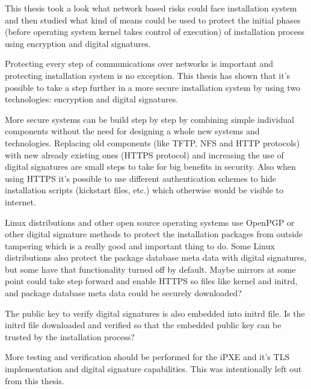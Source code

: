 
\iffalse
\begin{itemize}
\item FIXME: remove this list
\item CONCLUSIONS: reference to purpose of study
\item CONCLUSIONS: value of / reasons for the study
\item CONCLUSIONS: review of important findings / conclusions
\item CONCLUSIONS: comments, explanations or speculations about findings
\item CONCLUSIONS: limitations of study
\item CONCLUSIONS: implications of study or generalizations
\item CONCLUSIONS: recommendations for future or practical applications - USUALLY SKIPPED
\end{itemize}
\fi

This thesis took a look what network based risks could face
installation system and then studied what kind of means could be used
to protect the initial phases (before operating system kernel takes
control of execution) of installation process using encryption and
digital signatures.

Protecting every step of communications over networks is important and
protecting installation system is no exception. This thesis has shown
that it's possible to take a step further in a more secure
installation system by using two technologies: encryption and digital
signatures.

More secure systems can be build step by step by combining simple
individual components without the need for designing a whole new
systems and technologies. Replacing old components (like TFTP, NFS and
HTTP protocols) with new already existing ones (HTTPS protocol) and
increasing the use of digital signatures are small steps to take for
big benefits in security. Also when using HTTPS it's possible to use
different authentication schemes to hide installation scripts
(kickstart files, etc.) which otherwise would be visible to internet.

Linux distributions and other open source operating systems use
OpenPGP or other digital signature methods to protect the installation
packages from outside tampering which is a really good and important
thing to do. Some Linux distributions also protect the package
database meta data with digital signatures, but some have that
functionality turned off by default. Maybe mirrors at some point could
take step forward and enable HTTPS so files like kernel and initrd,
and package database meta data could be securely downloaded?

The public key to verify digital signatures is also embedded into
initrd file. Is the initrd file downloaded and verified so that the
embedded public key can be trusted by the installation process?

More testing and verification should be performed for the iPXE and
it's TLS implementation and digital signature capabilities. This was
intentionally left out from this thesis.
